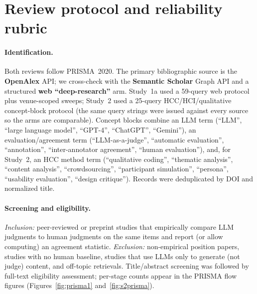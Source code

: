 \appendix

\section{Review protocol and reliability rubric}\label{app:protocol}
\paragraph{Identification.} Both reviews follow PRISMA~2020. The primary bibliographic source is the
\textbf{OpenAlex} API; we cross-check with the \textbf{Semantic Scholar} Graph API and a structured
\textbf{web ``deep-research''} arm. Study~1a used a 59-query web protocol plus venue-scoped sweeps; Study~2 used a
25-query HCC/HCI/qualitative concept-block protocol (the same query strings were issued against every source so the
arms are comparable). Concept blocks combine an LLM term (``LLM'', ``large language model'', ``GPT-4'', ``ChatGPT'',
``Gemini''), an evaluation/agreement term (``LLM-as-a-judge'', ``automatic evaluation'', ``annotation'', ``inter-annotator
agreement'', ``human evaluation''), and, for Study~2, an HCC method term (``qualitative coding'', ``thematic analysis'',
``content analysis'', ``crowdsourcing'', ``participant simulation'', ``persona'', ``usability evaluation'', ``design
critique''). Records were deduplicated by DOI and normalized title.

\paragraph{Screening and eligibility.} \emph{Inclusion:} peer-reviewed or preprint studies that empirically compare
LLM judgments to human judgments on the same items and report (or allow computing) an agreement statistic.
\emph{Exclusion:} non-empirical position papers, studies with no human baseline, studies that use LLMs only to
generate (not judge) content, and off-topic retrievals. Title/abstract screening was followed by full-text
eligibility assessment; per-stage counts appear in the PRISMA flow figures (Figures~\ref{fig:prisma1}
and~\ref{fig:s2prisma}).

